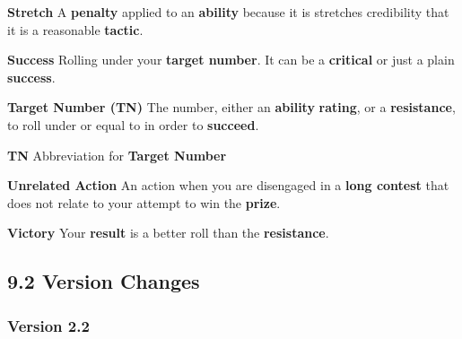 \documentclass[
]{article}
\begin{document}
\textbf{Stretch} A \textbf{penalty} applied to an \textbf{ability}
because it is stretches credibility that it is a reasonable
\textbf{tactic}.

\textbf{Success} Rolling under your \textbf{target number}. It can be a
\textbf{critical} or just a plain \textbf{success}.

\textbf{Target Number (TN)} The number, either an \textbf{ability}
\textbf{rating}, or a \textbf{resistance}, to roll under or equal to in
order to \textbf{succeed}.

\textbf{TN} Abbreviation for \textbf{Target Number}

\textbf{Unrelated Action} An action when you are disengaged in a
\textbf{long contest} that does not relate to your attempt to win the
\textbf{prize}.

\textbf{Victory} Your \textbf{result} is a better roll than the
\textbf{resistance}.

\hypertarget{version-changes}{%
\subsection{9.2 Version Changes}\label{version-changes}}

\hypertarget{version-2.2}{%
\subsubsection{Version 2.2}\label{version-2.2}}
\end{document}
